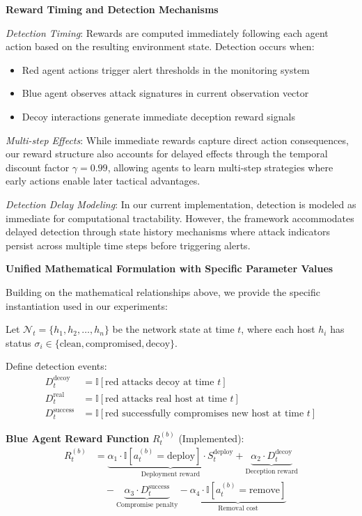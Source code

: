 \documentclass[12pt,oneside]{article}
\begin{document}
\textbf{Reward Timing and Detection Mechanisms}

\textit{Detection Timing}: Rewards are computed immediately following each agent action based on the resulting environment state. Detection occurs when:
\begin{itemize}
    \item Red agent actions trigger alert thresholds in the monitoring system
    \item Blue agent observes attack signatures in current observation vector
    \item Decoy interactions generate immediate deception reward signals
\end{itemize}

\textit{Multi-step Effects}: While immediate rewards capture direct action consequences, our reward structure also accounts for delayed effects through the temporal discount factor $\gamma = 0.99$, allowing agents to learn multi-step strategies where early actions enable later tactical advantages.

\textit{Detection Delay Modeling}: In our current implementation, detection is modeled as immediate for computational tractability. However, the framework accommodates delayed detection through state history mechanisms where attack indicators persist across multiple time steps before triggering alerts.

\textbf{Unified Mathematical Formulation with Specific Parameter Values}

Building on the mathematical relationships above, we provide the specific instantiation used in our experiments:

Let $\mathcal{N}_t = \{h_1, h_2, \ldots, h_n\}$ be the network state at time $t$, where each host $h_i$ has status $\sigma_i \in \{\text{clean}, \text{compromised}, \text{decoy}\}$. 

Define detection events:
\begin{align}
D_t^{\text{decoy}} &= \mathbb{I}[\text{red attacks decoy at time } t] \\
D_t^{\text{real}} &= \mathbb{I}[\text{red attacks real host at time } t] \\
D_t^{\text{success}} &= \mathbb{I}[\text{red successfully compromises new host at time } t]
\end{align}

\textbf{Blue Agent Reward Function} $R_t^{(b)}$ (Implemented):
\begin{align}
R_t^{(b)} &= \underbrace{\alpha_1 \cdot \mathbb{I}[a_t^{(b)} = \text{deploy}] \cdot S_t^{\text{deploy}}}_{\text{Deployment reward}} + \underbrace{\alpha_2 \cdot D_t^{\text{decoy}}}_{\text{Deception reward}} \nonumber \\
&\quad - \underbrace{\alpha_3 \cdot D_t^{\text{success}}}_{\text{Compromise penalty}} - \underbrace{\alpha_4 \cdot \mathbb{I}[a_t^{(b)} = \text{remove}]}_{\text{Removal cost}}
\end{align}
\end{document}
